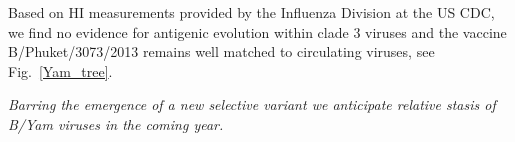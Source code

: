 \documentclass[11pt,oneside,letterpaper]{article}
\newcommand{\FIG}[1]{Fig.~\ref{#1}}
\begin{document}
Based on HI measurements provided by the Influenza Division at the US
CDC, we find no evidence for antigenic evolution within clade 3 viruses
and the vaccine B/Phuket/3073/2013 remains well matched to circulating
viruses, see \FIG{Yam_tree}.


\emph{Barring the emergence of a new selective variant we anticipate
relative stasis of B/Yam viruses in the coming year.}

\clearpage
\pagebreak



\end{document}
